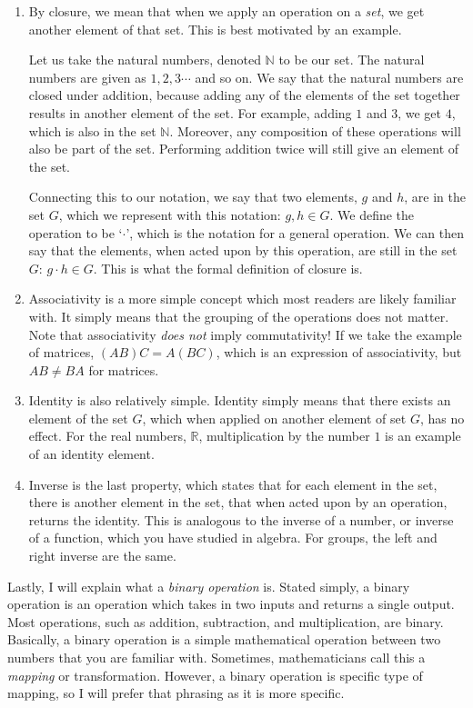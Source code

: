 \begin{enumerate}
    \item By closure, we mean that when we apply an operation on a \textit{set}, we get another element of that set. This is best motivated by an example. 

    Let us take the natural numbers, denoted $\mathbb{N}$ to be our set. The natural numbers are given as $1,2,3\cdots$  and so on. We say that the natural numbers are closed under addition, because adding any of the elements of the set together results in another element of the set. For example, adding $1$ and $3$, we get $4$, which is also in the set $\mathbb{N}$. Moreover, any composition of these operations will also be part of the set. Performing addition twice will still give an element of the set. 
    
    Connecting this to our notation, we say that two elements, $g$ and $h$, are in the set $G$, which we represent with this notation: $g,h \in G$. We define the operation to be `$\cdot$', which is the notation for a general operation. We can then say that the elements, when acted upon by this operation, are still in the set $G$: $g\cdot h \in G$. This is what the formal definition of closure is.
    \item Associativity is a more simple concept which most readers are likely familiar with. It simply means that the grouping of the operations does not matter. Note that associativity \textit{does not} imply commutativity! If we take the example of matrices, $(AB)C=A(BC)$, which is an expression of associativity, but $AB\neq BA$ for matrices. 
    \item Identity is also relatively simple. Identity simply means that there exists an element of the set $G$, which when applied on another element of set $G$, has no effect. For the real numbers, $\mathbb{R}$, multiplication by the number $1$ is an example of an identity element.
    \item Inverse is the last property, which states that for each element in the set, there is another element in the set, that when acted upon by an operation, returns the identity. This is analogous to the inverse of a number, or inverse of a function, which you have studied in algebra. For groups, the left and right inverse are the same.
\end{enumerate}

Lastly, I will explain what a \textit{binary operation} is. Stated simply, a binary operation is an operation which takes in two inputs and returns a single output. Most operations, such as addition, subtraction, and multiplication, are binary. Basically, a binary operation is a simple mathematical operation between two numbers that you are familiar with. Sometimes, mathematicians call this a \textit{mapping} or transformation. However, a binary operation is specific type of mapping, so I will prefer that phrasing as it is more specific.

